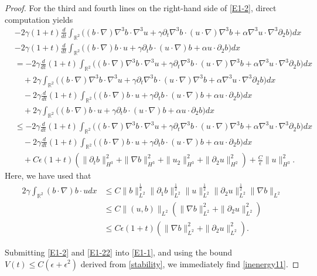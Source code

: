 \documentclass[reqno,11pt]{amsart}
\def\R{\mathbb R}
\numberwithin{Thm}{section}
\begin{document}
\begin{proof}
For the third and fourth lines on the right-hand side of \eqref{E1-2}, direct computation yields
\begin{align}\label{E1-22}
&-2\gamma(1+t)\frac{d}{dt}\int_{\R^2}\big((b\cdot\nabla)\nabla^3 b\cdot\nabla^3 u+\gamma\partial_{t}\nabla^3b\cdot (u\cdot\nabla)\nabla^3 b+\alpha\nabla^3u\cdot\nabla^3\partial_2 b\big)dx\nonumber\\
&-2\gamma(1+t)\frac{d}{dt}\int_{\R^2}\big((b\cdot\nabla) b\cdot u+\gamma\partial_{t}b\cdot (u\cdot\nabla) b+\alpha u\cdot\partial_2 b\big)dx\nonumber\\
&=-2\gamma\frac{d}{dt}(1+t)\int_{\R^2}\big((b\cdot\nabla)\nabla^3 b\cdot\nabla^3 u+\gamma\partial_{t}\nabla^3b\cdot (u\cdot\nabla)\nabla^3 b+\alpha\nabla^3u\cdot\nabla^3\partial_2 b\big)dx\nonumber\\
&\quad+2\gamma\int_{\R^2}\big((b\cdot\nabla)\nabla^3 b\cdot\nabla^3 u+\gamma\partial_{t}\nabla^3b\cdot (u\cdot\nabla)\nabla^3 b+\alpha\nabla^3u\cdot\nabla^3\partial_2 b\big)dx\nonumber\\
&\quad-2\gamma\frac{d}{dt}(1+t)\int_{\R^2}\big((b\cdot\nabla) b\cdot u+\gamma\partial_{t}b\cdot (u\cdot\nabla) b+\alpha u\cdot\partial_2 b\big)dx\nonumber\\
&\quad+2\gamma\int_{\R^2}\big((b\cdot\nabla) b\cdot u+\gamma\partial_{t}b\cdot (u\cdot\nabla) b+\alpha u\cdot\partial_2 b\big)dx\nonumber\\
&\leq-2\gamma\frac{d}{dt}(1+t)\int_{\R^2}\big((b\cdot\nabla)\nabla^3 b\cdot\nabla^3 u+\gamma\partial_{t}\nabla^3b\cdot (u\cdot\nabla)\nabla^3 b+\alpha\nabla^3u\cdot\nabla^3\partial_2 b\big)dx\nonumber\\
&\quad-2\gamma\frac{d}{dt}(1+t)\int_{\R^2}\big((b\cdot\nabla) b\cdot u+\gamma\partial_{t}b\cdot (u\cdot\nabla) b+\alpha u\cdot\partial_2 b\big)dx\nonumber\\
&\quad+ C\epsilon(1+t)\left(\|\partial_{t} b\|_{H^3}^2+\|\nabla b\|_{H^3}^2+\|u_2\|_{H^3}^2+\|\partial_{2}u\|_{H^2}^2\right)+\frac{C}{\epsilon}\|u\|_{H^3}^2.
\end{align}
Here, we have used that
\begin{align*}
2\gamma\int_{\R^2}(b\cdot\nabla) b\cdot udx&\leq C\|b\|_{L^2}^{\frac{1}{2}}\|\partial_1b\|_{L^2}^{\frac{1}{2}}\|u\|_{L^2}^{\frac{1}{2}}\|\partial_2u\|_{L^2}^{\frac{1}{2}}\|\nabla b\|_{L^2}\nonumber\\
&\leq C\|(u,b)\|_{L^2}(\|\nabla b\|_{L^2}^{2}+\|\partial_2u\|_{L^2}^2)\nonumber\\
&\leq C\epsilon(1+t)(\|\nabla b\|_{L^2}^{2}+\|\partial_2u\|_{L^2}^2).
\end{align*}


Submitting \eqref{E1-2} and \eqref{E1-22} into \eqref{E1-1}, and using the bound $V(t)\leq C(\epsilon+\epsilon^2)$
derived from \eqref{stability}, we immediately find \eqref{inenergy11}.
\end{proof}
\end{document}
